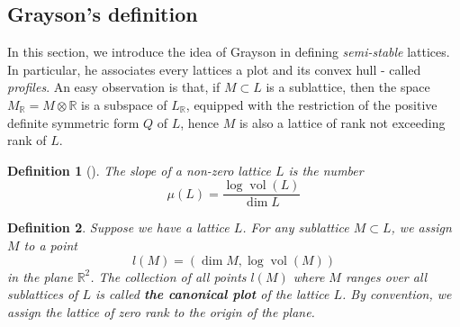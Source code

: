 \documentclass[12pt]{article} %
\newtheorem{definition}{Definition}[section]
\DeclareMathOperator{\vol}{vol}
\begin{document}
\subsection{Grayson's definition }
In this section, we introduce the idea of Grayson in defining \textit{semi-stable} lattices.
In particular, he associates every lattices a plot and its convex hull - called \textit{ profiles}.
An easy observation is that, if $M \subset L$ is a sublattice, then the space $M_\mathbb{R} = M \otimes \mathbb{R}$
is a subspace of $L_\mathbb{R}$, equipped with the restriction of the positive definite symmetric form $Q$ of $L$, hence $M$
is also a lattice of rank not exceeding rank of $L$.
\begin{definition}[\label = slope]
    The slope of a non-zero lattice $L$ is the number
    \[\mu(L) = \dfrac{\log\vol(L)}{\dim L}\]
\end{definition}
\begin{definition}
    Suppose we have a lattice $L$. For any sublattice $M \subset L$, we assign $M$ to a point
    \[l(M) = \left(\dim M, \log\vol(M)\right)\]
    in the plane $\mathbb{R}^2$. The collection of all points $l(M)$ where $M$ ranges over
    all sublattices of $L$ is called \textbf{ the canonical plot} of the lattice $L$. By convention, we assign
    the lattice of zero rank to the origin of the plane.
\end{definition}
\end{document}
